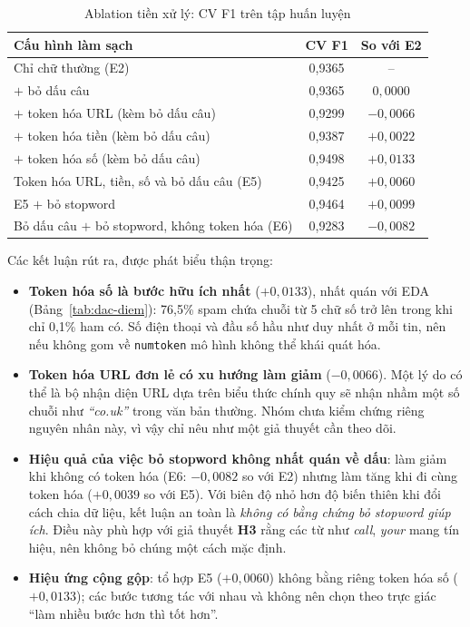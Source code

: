 \begin{table}[H]
\centering
\caption{Ablation tiền xử lý: CV F1 trên tập huấn luyện}
\label{tab:ablation}
\begin{tabular}{|p{8.6cm}|c|c|}
\hline
\textbf{Cấu hình làm sạch} & \textbf{CV F1} & \textbf{So với E2} \\
\hline
Chỉ chữ thường (E2) & 0,9365 & -- \\
\hline
$+$ bỏ dấu câu & 0,9365 & $0{,}0000$ \\
\hline
$+$ token hóa URL (kèm bỏ dấu câu) & 0,9299 & $-0{,}0066$ \\
\hline
$+$ token hóa tiền (kèm bỏ dấu câu) & 0,9387 & $+0{,}0022$ \\
\hline
$+$ token hóa số (kèm bỏ dấu câu) & 0,9498 & $+0{,}0133$ \\
\hline
Token hóa URL, tiền, số và bỏ dấu câu (E5) & 0,9425 & $+0{,}0060$ \\
\hline
E5 $+$ bỏ stopword & 0,9464 & $+0{,}0099$ \\
\hline
Bỏ dấu câu $+$ bỏ stopword, không token hóa (E6) & 0,9283 & $-0{,}0082$ \\
\hline
\end{tabular}
\end{table}

Các kết luận rút ra, được phát biểu thận trọng:

\begin{itemize}
    \item \textbf{Token hóa số là bước hữu ích nhất} ($+0{,}0133$), nhất quán với EDA (Bảng~\ref{tab:dac-diem}): 76,5\% spam chứa chuỗi từ 5 chữ số trở lên trong khi chỉ 0,1\% ham có. Số điện thoại và đầu số hầu như duy nhất ở mỗi tin, nên nếu không gom về \texttt{numtoken} mô hình không thể khái quát hóa.
    \item \textbf{Token hóa URL đơn lẻ có xu hướng làm giảm} ($-0{,}0066$). Một lý do có thể là bộ nhận diện URL dựa trên biểu thức chính quy sẽ nhận nhầm một số chuỗi như \textit{``co.uk''} trong văn bản thường. Nhóm chưa kiểm chứng riêng nguyên nhân này, vì vậy chỉ nêu như một giả thuyết cần theo dõi.
    \item \textbf{Hiệu quả của việc bỏ stopword không nhất quán về dấu}: làm giảm khi không có token hóa (E6: $-0{,}0082$ so với E2) nhưng làm tăng khi đi cùng token hóa ($+0{,}0039$ so với E5). Với biên độ nhỏ hơn độ biến thiên khi đổi cách chia dữ liệu, kết luận an toàn là \textit{không có bằng chứng bỏ stopword giúp ích}. Điều này phù hợp với giả thuyết \textbf{H3} rằng các từ như \textit{call}, \textit{your} mang tín hiệu, nên không bỏ chúng một cách mặc định.
    \item \textbf{Hiệu ứng cộng gộp}: tổ hợp E5 ($+0{,}0060$) không bằng riêng token hóa số ($+0{,}0133$); các bước tương tác với nhau và không nên chọn theo trực giác ``làm nhiều bước hơn thì tốt hơn''.
\end{itemize}

